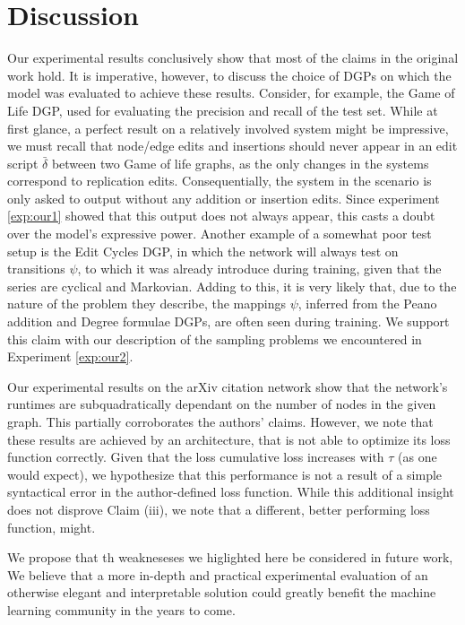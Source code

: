 \section{Discussion}
\label{sec:discuss}

Our experimental results conclusively show that most of the claims in the original work hold. It is imperative, however, to discuss the choice of DGPs on which the model was evaluated to achieve these results.
Consider, for example, the Game of Life DGP, used for evaluating the precision and recall of the test set. While at first glance, a perfect result on a relatively involved system might be impressive, we must recall that node/edge edits and insertions should never appear in an edit script $\bar{\delta}$ between two Game of life graphs, as the only changes in the systems correspond to replication edits. Consequentially, the system in the scenario is only asked to output without any addition or insertion edits. Since experiment \ref{exp:our1} showed that this output does not always appear, this casts a doubt over the model's expressive power. Another example of a somewhat poor test setup is the Edit Cycles DGP, in which the network will always test on transitions $\psi$, to which it was already introduce during training, given that the series are cyclical and Markovian. Adding to this, it is very likely that, due to the nature of the problem they describe, the mappings $\psi$, inferred from the Peano addition and Degree formulae DGPs, are often seen during training. We support this claim with our description of the sampling problems we encountered in Experiment \ref{exp:our2}.

Our experimental results on the arXiv citation network show that the network's runtimes are subquadratically dependant on the number of nodes in the given graph. This partially corroborates the authors' claims. However, we note that these results are achieved by an architecture, that is not able to optimize its loss function correctly. Given that the loss cumulative loss increases with $\tau$ (as one would expect), we hypothesize that this performance is not a result of a simple syntactical error in the author-defined loss function. While this additional insight does not disprove Claim (iii), 
we note that a different, better performing loss function, might.

We propose that th weakneseses we higlighted here be considered in future work, We believe that a more in-depth and practical experimental evaluation of an otherwise elegant and interpretable solution could greatly benefit the machine learning community in the years to come.

